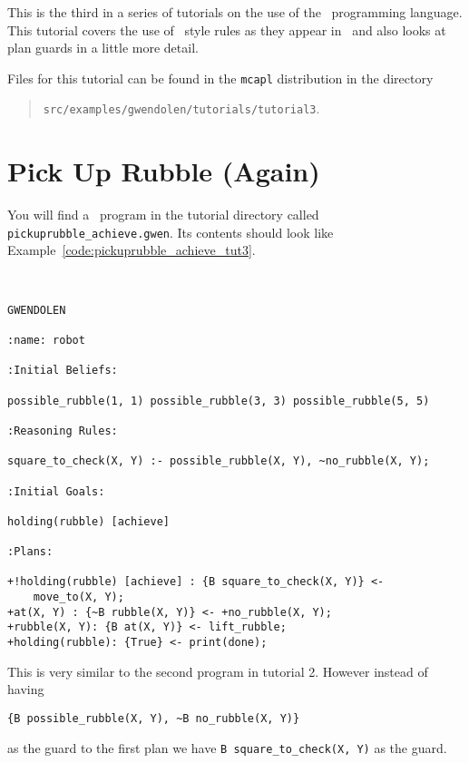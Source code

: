 
This is the third in a series of tutorials on the use of the \gwendolen\ programming language.  This tutorial covers the use of \prolog\ style rules as they appear in \gwendolen\ and also looks at plan guards in a little more detail.

Files for this tutorial can be found in the \texttt{mcapl} distribution in the directory 
\begin{quote}
\texttt{src/examples/gwendolen/tutorials/tutorial3}.
\end{quote}

\section{Pick Up Rubble (Again)}

You will find a \gwendolen\ program in the tutorial directory called \texttt{pickuprubble\_achieve.gwen}.  Its contents should look like Example~\ref{code:pickuprubble_achieve_tut3}.
\begin{ourexample}
\label{code:pickuprubble_achieve_tut3} \quad \\
\begin{lstlisting}[basicstyle=\sffamily,style=easslisting,language=Gwendolen]
GWENDOLEN

:name: robot

:Initial Beliefs:

possible_rubble(1, 1) possible_rubble(3, 3) possible_rubble(5, 5)

:Reasoning Rules:

square_to_check(X, Y) :- possible_rubble(X, Y), ~no_rubble(X, Y);

:Initial Goals:

holding(rubble) [achieve]

:Plans:

+!holding(rubble) [achieve] : {B square_to_check(X, Y)} <- 
    move_to(X, Y);
+at(X, Y) : {~B rubble(X, Y)} <- +no_rubble(X, Y);
+rubble(X, Y): {B at(X, Y)} <- lift_rubble;
+holding(rubble): {True} <- print(done);
\end{lstlisting}
\end{ourexample}

This is very similar to the second program in tutorial 2.  However instead of having 
\begin{verbatim}
{B possible_rubble(X, Y), ~B no_rubble(X, Y)}
\end{verbatim}as the guard to the first plan we have \lstinline{B square_to_check(X, Y)} as the guard.

